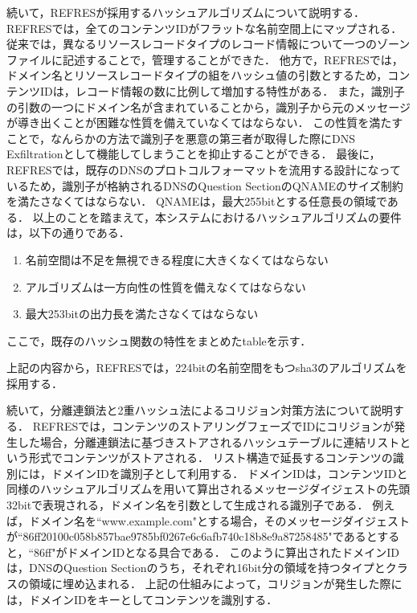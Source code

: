 続いて，REFRESが採用するハッシュアルゴリズムについて説明する．
REFRESでは，全てのコンテンツIDがフラットな名前空間上にマップされる．
従来では，異なるリソースレコードタイプのレコード情報について一つのゾーンファイルに記述することで，管理することができた．
他方で，REFRESでは，ドメイン名とリソースレコードタイプの組をハッシュ値の引数とするため，コンテンツIDは，レコード情報の数に比例して増加する特性がある．
また，識別子の引数の一つにドメイン名が含まれていることから，識別子から元のメッセージが導き出くことが困難な性質を備えていなくてはならない．
この性質を満たすことで，なんらかの方法で識別子を悪意の第三者が取得した際にDNS Exfiltrationとして機能してしまうことを抑止することができる．
最後に，REFRESでは，既存のDNSのプロトコルフォーマットを流用する設計になっているため，識別子が格納されるDNSのQuestion SectionのQNAMEのサイズ制約を満たさなくてはならない．
QNAMEは，最大255bitとする任意長の領域である．
以上のことを踏まえて，本システムにおけるハッシュアルゴリズムの要件は，以下の通りである．

\begin{enumerate}
 \item 名前空間は不足を無視できる程度に大きくなくてはならない
 \vspace{-3mm}
 \item アルゴリズムは一方向性の性質を備えなくてはならない
 \vspace{-3mm}
 \item 最大253bitの出力長を満たさなくてはならない
 \vspace{-3mm}
\end{enumerate}

ここで，既存のハッシュ関数の特性をまとめたtableを示す．

上記の内容から，REFRESでは，224bitの名前空間をもつsha3のアルゴリズムを採用する．

続いて，分離連鎖法と2重ハッシュ法によるコリジョン対策方法について説明する．
REFRESでは，コンテンツのストアリングフェーズでIDにコリジョンが発生した場合，分離連鎖法に基づきストアされるハッシュテーブルに連結リストという形式でコンテンツがストアされる．
リスト構造で延長するコンテンツの識別には，ドメインIDを識別子として利用する．
ドメインIDは，コンテンツIDと同様のハッシュアルゴリズムを用いて算出されるメッセージダイジェストの先頭32bitで表現される，ドメイン名を引数として生成される識別子である．
例えば，ドメイン名を``www.example.com"とする場合，そのメッセージダイジェストが``86ff20100c058b857bae9785bf0267e6c6afb740c18b8e9a87258485"であるとすると，``86ff"がドメインIDとなる具合である．
このように算出されたドメインIDは，DNSのQuestion Sectionのうち，それぞれ16bit分の領域を持つタイプとクラスの領域に埋め込まれる．
上記の仕組みによって，コリジョンが発生した際には，ドメインIDをキーとしてコンテンツを識別する．


